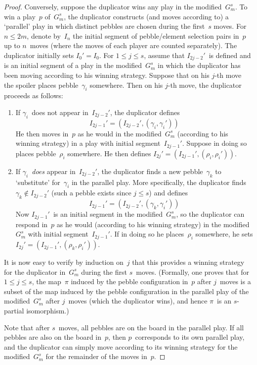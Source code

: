 \documentclass[letterpaper]{article}
\theoremstyle{plain}
\begin{document}
\begin{enumerate}
\begin{proof}
Conversely, suppose the duplicator wins any play in the modified~$G_m^s$. To win a play~$p$ of~$G_m^s$, the duplicator constructs (and moves according to) a `parallel' play in which distinct pebbles are chosen during the first~$s$ moves. For $n\le 2m$, denote by~$I_n$ the initial segment of pebble/element selection pairs in~$p$ up to $n$~moves (where the moves of each player are counted separately). The duplicator initially sets $I_0'=I_0$. For $1\le j\le s$, assume that $I_{2j-2}'$~is defined and is an initial segment of a play in the modified~$G_m^s$ in which the duplicator has been moving according to his winning strategy. Suppose that on his $j$-th move the spoiler places pebble~$\gamma_i$ somewhere. Then on his $j$-th move, the duplicator proceeds as follows:
\begin{enumerate}
\item If $\gamma_i$~does not appear in~$I_{2j-2}'$, the duplicator defines
$$I_{2j-1}'=(I_{2j-2}',(\gamma_i,\gamma_i'))$$
He then moves in~$p$ as he would in the modified~$G_m^s$ (according to his winning strategy) in a play with initial segment~$I_{2j-1}'$. Suppose in doing so places pebble~$\rho_i$ somewhere. He then defines $I_{2j}'=(I_{2j-1}',(\rho_i,\rho_i'))$.
\item If $\gamma_i$~\emph{does} appear in~$I_{2j-2}'$, the duplicator finds a new pebble~$\gamma_k$ to `substitute' for~$\gamma_i$ in the parallel play. More specifically, the duplicator finds $\gamma_k\not\in I_{2j-2}'$ (such a pebble exists since $j\le s$) and defines
$$I_{2j-1}'=(I_{2j-2}',(\gamma_k,\gamma_i'))$$
Now $I_{2j-1}'$~is an initial segment in the modified~$G_m^s$, so the duplicator can respond in~$p$ as he would (according to his winning strategy) in the modified~$G_m^s$ with initial segment~$I_{2j-1}'$. If in doing so he places~$\rho_i$ somewhere, he sets $I_{2j}'=(I_{2j-1}',(\rho_k,\rho_i'))$.
\end{enumerate}
It is now easy to verify by induction on~$j$ that this provides a winning strategy for the duplicator in~$G_m^s$ during the first $s$~moves. (Formally, one proves that for $1\le j\le s$, the map~$\pi$ induced by the pebble configuration in~$p$ after $j$~moves is a subset of the map induced by the pebble configuration in the parallel play of the modified~$G_m^s$ after $j$~moves (which the duplicator wins), and hence $\pi$~is an $s$-partial isomorphism.)

Note that after $s$~moves, all pebbles are on the board in the parallel play. If all pebbles are also on the board in~$p$, then $p$~corresponds to its own parallel play, and the duplicator can simply move according to its winning strategy for the modified~$G_m^s$ for the remainder of the moves in~$p$.


\end{proof}
\end{enumerate}
\end{document}
